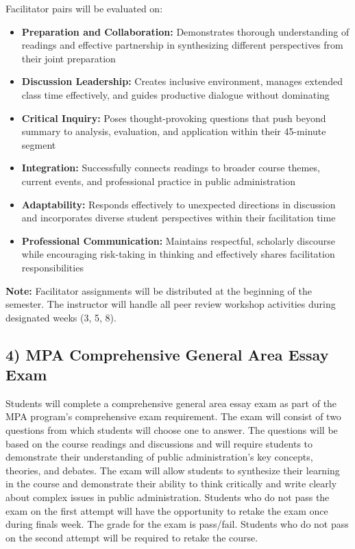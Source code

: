 \documentclass[12pt]{article}     %
\begin{document}
Facilitator pairs will be evaluated on:
\begin{itemize}
    \item \textbf{Preparation and Collaboration:} Demonstrates thorough understanding of readings and effective partnership in synthesizing different perspectives from their joint preparation
    \item \textbf{Discussion Leadership:} Creates inclusive environment, manages extended class time effectively, and guides productive dialogue without dominating
    \item \textbf{Critical Inquiry:} Poses thought-provoking questions that push beyond summary to analysis, evaluation, and application within their 45-minute segment
    \item \textbf{Integration:} Successfully connects readings to broader course themes, current events, and professional practice in public administration
    \item \textbf{Adaptability:} Responds effectively to unexpected directions in discussion and incorporates diverse student perspectives within their facilitation time
    \item \textbf{Professional Communication:} Maintains respectful, scholarly discourse while encouraging risk-taking in thinking and effectively shares facilitation responsibilities
\end{itemize}

\textbf{Note:} Facilitator assignments will be distributed at the beginning of the semester. The instructor will handle all peer review workshop activities during designated weeks (3, 5, 8).

\subsection*{4) MPA Comprehensive General Area Essay Exam}

Students will complete a comprehensive general area essay exam as part of the MPA program's comprehensive exam requirement. The exam will consist of two questions from which students will choose one to answer. The questions will be based on the course readings and discussions and will require students to demonstrate their understanding of public administration's key concepts, theories, and debates. The exam will allow students to synthesize their learning in the course and demonstrate their ability to think critically and write clearly about complex issues in public administration. Students who do not pass the exam on the first attempt will have the opportunity to retake the exam once during finals week. The grade for the exam is pass/fail. Students who do not pass on the second attempt will be required to retake the course.
\end{document}
